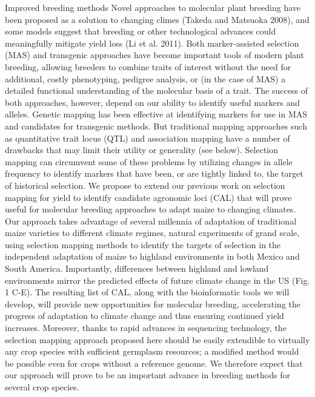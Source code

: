 Improved breeding methods
Novel approaches to molecular plant breeding have been proposed as a solution to changing climes (Takeda and Matsuoka 2008), and some models suggest that breeding or other technological advances could meaningfully mitigate yield loss (Li et al. 2011).  Both marker-assisted selection (MAS) and transgenic approaches have become important tools of modern plant breeding, allowing breeders to combine traits of interest without the need for additional, costly phenotyping, pedigree analysis, or (in the case of MAS) a detailed functional understanding of the molecular basis of a trait. The success of both approaches, however, depend on our ability to identify useful markers and alleles.  Genetic mapping has been effective at identifying markers for use in MAS and candidates for transgenic methods.  But traditional mapping approaches such as quantitative trait locus (QTL) and association mapping have a number of drawbacks that may limit their utility or generality (see below). 
Selection mapping can circumvent some of these problems by utilizing changes in allele frequency to identify markers that have been, or are tightly linked to, the target of historical selection. We propose to extend our previous work on selection mapping for yield to identify candidate agronomic loci (CAL) that will prove useful for molecular breeding approaches to adapt maize to changing climates. Our approach takes advantage of several millennia of adaptation of traditional maize varieties to different climate regimes, natural experiments of grand scale, using selection mapping methods to identify the targets of selection in the independent adaptation of maize to highland environments in both Mexico and South America.  Importantly, differences between highland and lowland environments mirror the predicted effects of future climate change in the US (Fig. 1 C-E).  
The resulting list of CAL, along with the bioinformatic tools we will develop, will provide new opportunities for molecular breeding, accelerating the progress of adaptation to climate change and thus ensuring continued yield increases.  Moreover, thanks to rapid advances in sequencing technology, the selection mapping approach proposed here should be easily extendible to virtually any crop species with sufficient germplasm resources; a modified method would be possible even for crops without a reference genome.  We therefore expect that our approach will prove to be an important advance in breeding methods for several crop species.

